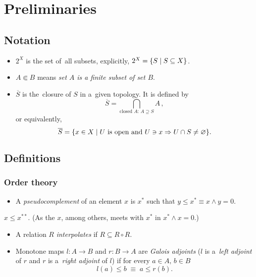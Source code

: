\chapter{Preliminaries}

\section{Notation}

\begin{itemize}
\item $2^X$ is the set of~all subsets, explicitly, $2^X = \{ S \mid S\subseteq X
\}$.

\item $A \Subset B$ means {\sl set $A$ is a finite subset of set $B$\/}.

\item $\overline{S}$ is the~closure of $S$ in a~given topology.
It is defined by
\[
  \overline{S} = \bigcap_{ \text{closed } A\colon \, A\supseteq S} A
  \, ,
\]
or equivalently,
\[
  \overline{S} = \{ x \in X \mid U \text{ is open and } U\owns x \Rightarrow U
  \cap S \ne \varnothing \}.
\]

\end{itemize}

\section{Definitions}

\subsection*{Order theory}

\begin{itemize}
\item A \emph{pseudocomplement} of an element $x$ is $x^*$ such that $y \le x^*
\equiv x \wedge y = 0$.
\end{itemize}

\begin{fact}
  $x \le x^{**}$.
  (As the $x$, among others, meets with $x^*$ in $x^* \wedge x = 0$.)
\end{fact}

\begin{itemize}
\item A relation $R$ \emph{interpolates} if $R \subseteq R \circ R$.

\item Monotone maps $l\colon A \to B$ and $r\colon B \to A$ are \emph{Galois
  adjoints\/} ($l$ is a~\emph{left adjoint\/} of $r$ and $r$ is a~\emph{right
  adjoint\/} of $l$) if for every $a\in A, \, b\in B$
  \[
    l(a) \le b \; \equiv \; a \le r(b).
  \]
\end{itemize}

